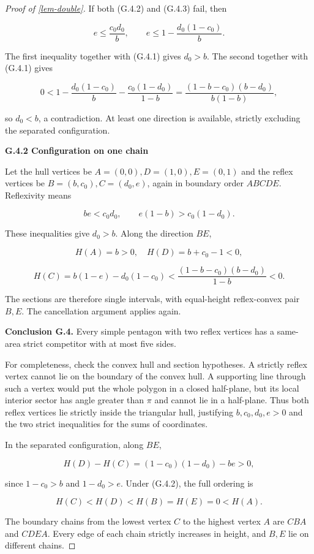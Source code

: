 \documentclass[11pt,a4paper]{article}
\theoremstyle{proofmanuscript}
\begin{document}
\begin{proof}[Proof of \ref{lem-double}]
If both (G.4.2) and (G.4.3) fail, then

\[
e\le\frac{c_0d_0}{b},\qquad
 e\le1-\frac{d_0(1-c_0)}b.
\]

The first inequality together with (G.4.1) gives \(d_0>b\). The second together with (G.4.1) gives

\[
0<1-\frac{d_0(1-c_0)}b-\frac{c_0(1-d_0)}{1-b}
=\frac{(1-b-c_0)(b-d_0)}{b(1-b)},
\]

so \(d_0<b\), a contradiction. At least one direction is available, strictly excluding the separated configuration.

\textbf{G.4.2 Configuration on one chain}

Let the hull vertices be \(A=(0,0),D=(1,0),E=(0,1)\) and the reflex vertices be \(B=(b,c_0),C=(d_0,e)\), again in boundary order \(A B C D E\). Reflexivity means

\[
be<c_0d_0,
\qquad e(1-b)>c_0(1-d_0).
\tag{G.4.4}
\]

These inequalities give \(d_0>b\). Along the direction \(BE\),

\[
H(A)=b>0,\quad H(D)=b+c_0-1<0,
\]

\[
H(C)=b(1-e)-d_0(1-c_0)
<\frac{(1-b-c_0)(b-d_0)}{1-b}<0.
\tag{G.4.5}
\]

The sections are therefore single intervals, with equal-height reflex-convex pair \(B,E\). The cancellation argument applies again.

\textbf{Conclusion G.4.} Every simple pentagon with two reflex vertices has a same-area strict competitor with at most five sides.

For completeness, check the convex hull and section hypotheses. A strictly reflex vertex cannot lie on the boundary of the convex hull. A supporting line through such a vertex would put the whole polygon in a closed half-plane, but its local interior sector has angle greater than \(\pi\) and cannot lie in a half-plane. Thus both reflex vertices lie strictly inside the triangular hull, justifying \(b,c_0,d_0,e>0\) and the two strict inequalities for the sums of coordinates.

In the separated configuration, along \(BE\),

\[
H(D)-H(C)=(1-c_0)(1-d_0)-be>0,
\]

since \(1-c_0>b\) and \(1-d_0>e\). Under (G.4.2), the full ordering is

\[
H(C)<H(D)<H(B)=H(E)=0<H(A).
\]

The boundary chains from the lowest vertex \(C\) to the highest vertex \(A\) are \(CBA\) and \(CDEA\). Every edge of each chain strictly increases in height, and \(B,E\) lie on different chains.


\end{proof}
\end{document}
